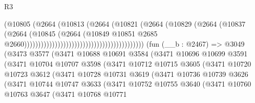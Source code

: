 \begin{lexlean}{R3}
\begin{coremodule}
                                                                (@10805
                                                                  (@2664
                                                                    (@10813
                                                                      (@2664
                                                                        (@10821
                                                                          (@2664
                                                                            (@10829
                                                                              (@2664
                                                                                (@10837
                                                                                  (@2664
                                                                                    (@10845
                                                                                      (@2664
                                                                                        (@10849
                                                                                          @10851
                                                                                          @2685
                                                                                          @2660)))))))))))))))))))))))))))))))))))))))))))
    (fun (__b : @2467) =>
    @3049
      (@3473
        @3577
        (@3471
          @10688
          @10691
          @3584
          (@3471
            @10696
            @10699
            @3591
            (@3471
              @10704
              @10707
              @3598
              (@3471
                @10712
                @10715
                @3605
                (@3471
                  @10720
                  @10723
                  @3612
                  (@3471
                    @10728
                    @10731
                    @3619
                    (@3471
                      @10736
                      @10739
                      @3626
                      (@3471
                        @10744
                        @10747
                        @3633
                        (@3471
                          @10752
                          @10755
                          @3640
                          (@3471
                            @10760
                            @10763
                            @3647
                            (@3471
                              @10768
                              @10771

\end{coremodule}
\end{lexlean}
